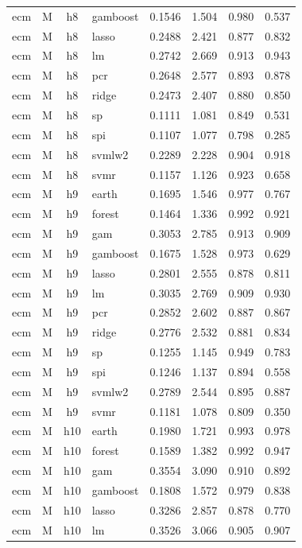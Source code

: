 \begin{ThreePartTable}
\begin{longtable}[t]{llclcccc}
ecm & M & h8 & gamboost & 0.1546 & 1.504 & 0.980 & 0.537\\
ecm & M & h8 & lasso & 0.2488 & 2.421 & 0.877 & 0.832\\
ecm & M & h8 & lm & 0.2742 & 2.669 & 0.913 & 0.943\\
ecm & M & h8 & pcr & 0.2648 & 2.577 & 0.893 & 0.878\\
ecm & M & h8 & ridge & 0.2473 & 2.407 & 0.880 & 0.850\\
ecm & M & h8 & sp & 0.1111 & 1.081 & 0.849 & 0.531\\
ecm & M & h8 & spi & 0.1107 & 1.077 & 0.798 & 0.285\\
ecm & M & h8 & svmlw2 & 0.2289 & 2.228 & 0.904 & 0.918\\
ecm & M & h8 & svmr & 0.1157 & 1.126 & 0.923 & 0.658\\
\addlinespace
ecm & M & h9 & earth & 0.1695 & 1.546 & 0.977 & 0.767\\
ecm & M & h9 & forest & 0.1464 & 1.336 & 0.992 & 0.921\\
ecm & M & h9 & gam & 0.3053 & 2.785 & 0.913 & 0.909\\
ecm & M & h9 & gamboost & 0.1675 & 1.528 & 0.973 & 0.629\\
ecm & M & h9 & lasso & 0.2801 & 2.555 & 0.878 & 0.811\\
ecm & M & h9 & lm & 0.3035 & 2.769 & 0.909 & 0.930\\
ecm & M & h9 & pcr & 0.2852 & 2.602 & 0.887 & 0.867\\
ecm & M & h9 & ridge & 0.2776 & 2.532 & 0.881 & 0.834\\
ecm & M & h9 & sp & 0.1255 & 1.145 & 0.949 & 0.783\\
ecm & M & h9 & spi & 0.1246 & 1.137 & 0.894 & 0.558\\
ecm & M & h9 & svmlw2 & 0.2789 & 2.544 & 0.895 & 0.887\\
ecm & M & h9 & svmr & 0.1181 & 1.078 & 0.809 & 0.350\\
\addlinespace
ecm & M & h10 & earth & 0.1980 & 1.721 & 0.993 & 0.978\\
ecm & M & h10 & forest & 0.1589 & 1.382 & 0.992 & 0.947\\
ecm & M & h10 & gam & 0.3554 & 3.090 & 0.910 & 0.892\\
ecm & M & h10 & gamboost & 0.1808 & 1.572 & 0.979 & 0.838\\
ecm & M & h10 & lasso & 0.3286 & 2.857 & 0.878 & 0.770\\
ecm & M & h10 & lm & 0.3526 & 3.066 & 0.905 & 0.907\\

\end{longtable}
\end{ThreePartTable}
